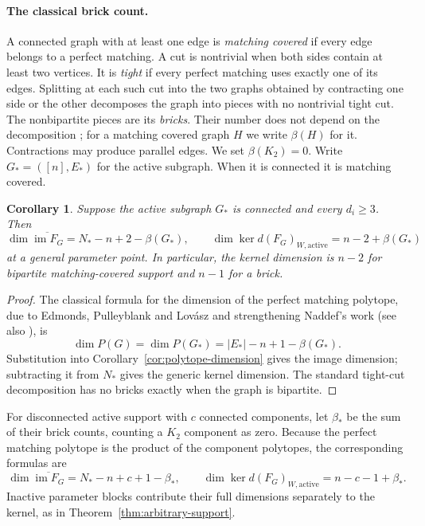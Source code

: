 \documentclass[11pt]{article}
\newtheorem{corollary}[theorem]{Corollary}
\theoremstyle{remark}\newtheorem{remark}[theorem]{Remark}
\begin{document}
\paragraph{The classical brick count.}
A connected graph with at least one edge is \emph{matching covered} if every edge belongs to a
perfect matching. A cut is nontrivial when both sides contain at least two vertices. It is \emph{tight} if every perfect
matching uses exactly one of its edges. Splitting at each such cut into the two graphs obtained by contracting
one side or the other decomposes the graph into pieces with
no nontrivial tight cut. The nonbipartite pieces are its \emph{bricks}.
Their number does not depend on the decomposition \cite{lovasz}; for a
matching covered graph $H$ we write $\beta(H)$ for it.
Contractions may produce parallel edges. We set $\beta(K_2)=0$.
Write $G_*=([n],E_*)$ for the active subgraph. When it is connected it
is matching covered.

\begin{corollary}\label{cor:brick-dimension}
Suppose the active subgraph $G_*$ is connected and every $d_i\geq3$. Then
\[
 \dim\overline{\operatorname{im}F_G}=N_*-n+2-\beta(G_*),
 \qquad \dim\ker d(F_G)_{W,\mathrm{active}}=n-2+\beta(G_*)
\]
at a general parameter point. In particular, the kernel dimension is
$n-2$ for bipartite matching-covered support and $n-1$ for a brick.
\end{corollary}
\begin{proof}
The classical formula for the dimension of the perfect matching
polytope, due to Edmonds, Pulleyblank and Lov\'asz and strengthening
Naddef's work \cite{elp,naddef} (see also
\cite[Section 1.2]{abdi-silina}), is
\[
 \dim P(G)=\dim P(G_*)=|E_*|-n+1-\beta(G_*).
\]
Substitution into Corollary~\ref{cor:polytope-dimension} gives the image
dimension; subtracting it from $N_*$ gives the generic kernel dimension.
The standard tight-cut decomposition has no bricks exactly when the
graph is bipartite.
\end{proof}

For disconnected active support with $c$ connected components, let $\beta_*$
be the sum of their brick counts, counting a $K_2$ component as zero.
Because the perfect matching polytope is the product of the component
polytopes, the corresponding formulas are
\begin{equation}\label{eq:disconnected}
 \dim\overline{\operatorname{im}F_G}=N_*-n+c+1-\beta_*,
 \qquad \dim\ker d(F_G)_{W,\mathrm{active}}=n-c-1+\beta_*.
\end{equation}
Inactive parameter blocks contribute their full dimensions separately
to the kernel, as in Theorem~\ref{thm:arbitrary-support}.
\end{document}
